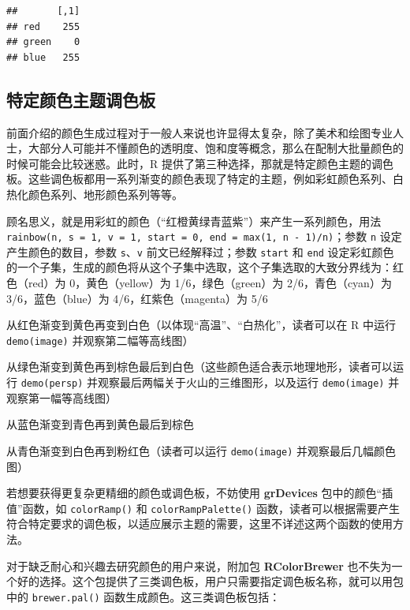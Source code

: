 \documentclass[
  b5paper,
  UTF8,twoside]{book}
\providecommand{\tightlist}{%
  \setlength{\itemsep}{0pt}\setlength{\parskip}{0pt}}
\begin{document}
\begin{verbatim}
##       [,1]
## red    255
## green    0
## blue   255
\end{verbatim}

\subsection{特定颜色主题调色板}\label{subsec:palette}

前面介绍的颜色生成过程对于一般人来说也许显得太复杂，除了美术和绘图专业人士，大部分人可能并不懂颜色的透明度、饱和度等概念，那么在配制大批量颜色的时候可能会比较迷惑。此时，R 提供了第三种选择，那就是特定颜色主题的调色板。这些调色板都用一系列渐变的颜色表现了特定的主题，例如彩虹颜色系列、白热化颜色系列、地形颜色系列等等。

\begin{description}
\tightlist
\item[\texttt{rainbow()}]
顾名思义，就是用彩虹的颜色（``红橙黄绿青蓝紫''）来产生一系列颜色，用法 \texttt{rainbow(n,\ s\ =\ 1,\ v\ =\ 1,\ start\ =\ 0,\ end\ =\ max(1,\ n\ -\ 1)/n)}；参数 \texttt{n} 设定产生颜色的数目，参数 \texttt{s}、\texttt{v} 前文已经解释过；参数 \texttt{start} 和 \texttt{end} 设定彩虹颜色的一个子集，生成的颜色将从这个子集中选取，这个子集选取的大致分界线为：红色（red）为 0，黄色（yellow）为 1/6，绿色（green）为 2/6，青色（cyan）为 3/6，蓝色（blue）为 4/6，红紫色（magenta）为 5/6
\item[\texttt{heat.colors()}]
从红色渐变到黄色再变到白色（以体现``高温''、``白热化''，读者可以在 R 中运行 \texttt{demo(image)} 并观察第二幅等高线图）
\item[\texttt{terrain.colors()}]
从绿色渐变到黄色再到棕色最后到白色（这些颜色适合表示地理地形，读者可以运行 \texttt{demo(persp)} 并观察最后两幅关于火山的三维图形，以及运行 \texttt{demo(image)} 并观察第一幅等高线图）
\item[\texttt{topo.colors()}]
从蓝色渐变到青色再到黄色最后到棕色
\item[\texttt{cm.colors()}]
从青色渐变到白色再到粉红色（读者可以运行 \texttt{demo(image)} 并观察最后几幅颜色图）
\end{description}

若想要获得更复杂更精细的颜色或调色板，不妨使用 \textbf{grDevices} 包中的颜色``插值''函数，如 \texttt{colorRamp()} 和 \texttt{colorRampPalette()} 函数，读者可以根据需要产生符合特定要求的调色板，以适应展示主题的需要，这里不详述这两个函数的使用方法。

对于缺乏耐心和兴趣去研究颜色的用户来说，附加包 \textbf{RColorBrewer}\citep{RColorBrewer} 也不失为一个好的选择。这个包提供了三类调色板，用户只需要指定调色板名称，就可以用包中的 \texttt{brewer.pal()} 函数生成颜色。这三类调色板包括：
\end{document}
